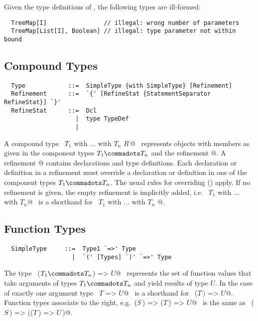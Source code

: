 \example Given the type definitions of ,
the following types are ill-formed:

\begin{lstlisting}
  TreeMap[I]                // illegal: wrong number of parameters
  TreeMap[List[I], Boolean] // illegal: type parameter not within bound
\end{lstlisting}

\subsection{Compound Types}
\label{sec:compound-types}
\label{sec:refinements}

\syntax\begin{lstlisting}
  Type            ::=  SimpleType {with SimpleType} [Refinement]
  Refinement      ::=  `{' [RefineStat {StatementSeparator RefineStat}] `}'
  RefineStat      ::=  Dcl
                    |  type TypeDef
                    |
\end{lstlisting}

A compound type ~\lstinline@$T_1$ with $\ldots$ with $T_n$ {$R\,$}@~
represents objects with members as given in the component types $T_1
\commadots T_n$ and the refinement @. A refinement
@ contains declarations and type definitions. Each
declaration or definition in a refinement must override a declaration
or definition in one of the component types $T_1 \commadots T_n$. The
usual rules for overriding () apply. If no
refinement is given, the empty refinement is implicitly added,
i.e. ~\lstinline@$T_1$ with $\ldots$ with $T_n$@~ is a shorthand for
~\lstinline@$T_1$ with $\ldots$ with $T_n$ {}@.
 
\subsection{Function Types}
\label{sec:function-types}

\syntax\begin{lstlisting}
  SimpleType     ::=  Type1 `=>' Type
                   |  `(' [Types] `)' `=>' Type
\end{lstlisting}
The type ~\lstinline@($T_1 \commadots T_n$) => $U$@~ represents the set of function
values that take arguments of types $T_1 \commadots T_n$ and yield
results of type $U$.  In the case of exactly one argument type
~\lstinline@$T$ => $U$@~ is a shorthand for ~\lstinline@($T\,$) => $U$@.  Function types
associate to the right, e.g.~\lstinline@($S\,$) => ($T\,$) => $U$@~ is the same as
~\lstinline@($S\,$) => (($T\,$) => $U\,$)@.

